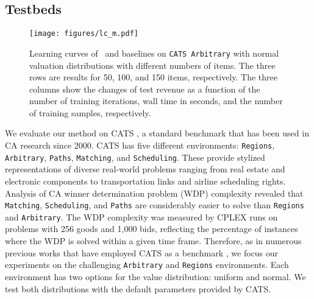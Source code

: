
\subsection{Testbeds}

\begin{figure}
    \centering
    \texttt{[image: figures/lc\_m.pdf]}
    \caption{Learning curves of \name~and baselines on \texttt{CATS Arbitrary} with normal valuation distributions with different numbers of items. The three rows are results for 50, 100, and 150 items, respectively. The three columns show the changes of test revenue as a function of the number of training iterations, wall time in seconds, and the number of training samples, respectively. 
    \label{fig:lcm}}
\end{figure}

We evaluate our method on CATS \citep{leyton2000towards}, a standard benchmark that has been used in CA research since 2000. CATS has five different environments: \texttt{Regions}, \texttt{Arbitrary}, \texttt{Paths}, \texttt{Matching}, and \texttt{Scheduling}. These provide stylized representations of diverse real-world problems ranging from real estate and electronic components to transportation links and airline scheduling rights. Analysis of CA winner determination problem (WDP) complexity \citep{catshardness} revealed that \texttt{Matching}, \texttt{Scheduling}, and \texttt{Paths} are considerably easier to solve than \texttt{Regions} and \texttt{Arbitrary}. The WDP complexity was measured by CPLEX runs on problems with 256 goods and 1,000 %
bids, reflecting the percentage of instances where the WDP is solved within a given time frame. Therefore, as in numerous previous works that have employed CATS as a benchmark \citep{gasse2019exact, hutter2009paramils, hutter2014algorithm, balcan2018learning, scavuzzo2022learning, wu2021learning, huang2023searching, song2020general, gupta2022lookback, balcan2021sample, zhang2022deep}, we focus our experiments on the challenging \texttt{Arbitrary} and  \texttt{Regions} environments. Each environment has two options for the value distribution: uniform and normal. We test both distributions with the default parameters provided by CATS.

